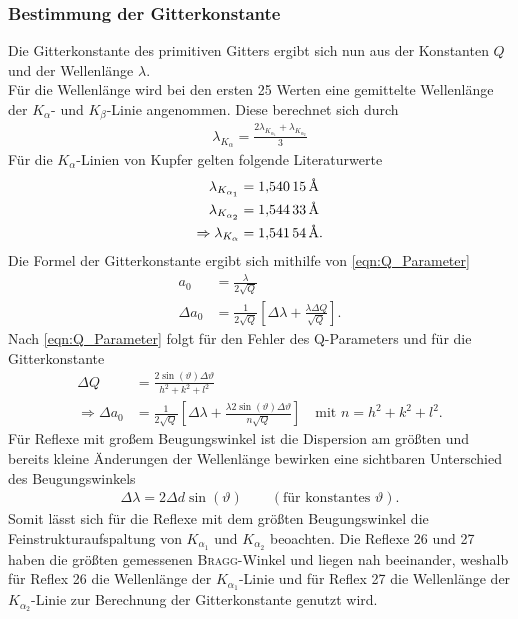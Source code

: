 \documentclass[a4paper,twoside,final]{article}
\begin{document}
\subsubsection{Bestimmung der Gitterkonstante}
Die Gitterkonstante des primitiven Gitters ergibt sich nun aus der Konstanten $Q$ und der Wellenlänge $\lambda$.\\
Für die Wellenlänge wird bei den ersten 25 Werten eine gemittelte Wellenlänge der $K_\alpha$- und $K_\beta$-Linie angenommen. Diese berechnet sich durch
\begin{align}
  \lambda_{K_\alpha} = \frac{2\lambda_{K_{\alpha_1}}+\lambda_{K_{\alpha_2}}}{3}
\end{align}
Für die $K_\alpha$-Linien von Kupfer gelten folgende Literaturwerte
\begin{align}
  \lambda_{K_{\alpha_1}} &= \SI{1,54015}{\textup{\AA}}\nonumber\\
  \lambda_{K_{\alpha_2}} &= \SI{1,54433}{\textup{\AA}}\label{eqn:Wellenlänge}\\
\Rightarrow \lambda_{K_\alpha} &= \SI{1,54154}{\textup{\AA}}.\nonumber
\end{align}
Die Formel der Gitterkonstante ergibt sich mithilfe von \eqref{eqn:Q_Parameter}
\begin{align}
  a_0 &= \frac{\lambda}{2 \sqrt{Q}}\\
  \Delta a_0 &= \frac{1}{2\sqrt{Q}} \left[\Delta \lambda + \frac{\lambda \Delta Q}{\sqrt{Q}}\right].
\end{align}
Nach \eqref{eqn:Q_Parameter} folgt für den Fehler des Q-Parameters und für die Gitterkonstante
\begin{align}
  \Delta Q &= \frac{2 \sin(\vartheta)\Delta \vartheta}{h^2+k^2+l^2}\\
  \Rightarrow \Delta a_0 &= \frac{1}{2\sqrt{Q}} \left[\Delta \lambda + \frac{\lambda 2 \sin(\vartheta)\Delta \vartheta}{n\sqrt{Q}}\right] \quad \text{mit }n = h^2+k^2+l^2.
\end{align}
Für Reflexe mit großem Beugungswinkel ist die Dispersion am größten und bereits kleine Änderungen der Wellenlänge bewirken eine sichtbaren Unterschied des Beugungswinkels
\begin{align}
  \Delta \lambda = 2 \Delta d \sin(\vartheta) \qquad (\text{für konstantes }\vartheta).
\end{align}
Somit lässt sich für die Reflexe mit dem größten Beugungswinkel die Feinstrukturaufspaltung von $K_{\alpha_1}$ und $K_{\alpha_2}$ beoachten. Die Reflexe 26 und 27 haben die größten gemessenen \textsc{Bragg}-Winkel und liegen nah beeinander, weshalb für Reflex 26 die Wellenlänge der $K_{\alpha_1}$-Linie und für Reflex 27 die Wellenlänge der $K_{\alpha_2}$-Linie zur Berechnung der Gitterkonstante genutzt wird.
\end{document}
